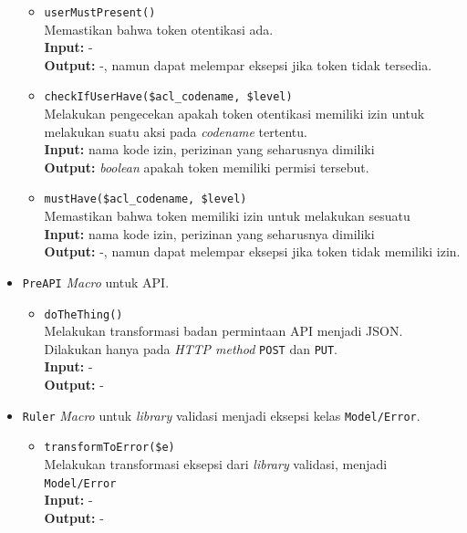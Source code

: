 \begin{itemize}
\begin{itemize}
                \item \texttt{userMustPresent()} \\
                    Memastikan bahwa token otentikasi ada. \\
                    \textbf{Input:} -\\
                    \textbf{Output:} -, namun dapat melempar eksepsi jika token tidak tersedia.
                    
                \item \texttt{checkIfUserHave(\$acl\_codename, \$level)} \\
                    Melakukan pengecekan apakah token otentikasi memiliki izin untuk melakukan suatu
                    aksi pada \textit{codename} tertentu.\\
                    \textbf{Input:} nama kode izin, perizinan yang seharusnya dimiliki\\
                    \textbf{Output:} \textit{boolean} apakah token memiliki permisi tersebut.
                    
                \item \texttt{mustHave(\$acl\_codename, \$level)} \\
                    Memastikan bahwa token memiliki izin untuk melakukan sesuatu \\
                    \textbf{Input:} nama kode izin, perizinan yang seharusnya dimiliki\\
                    \textbf{Output:} -, namun dapat melempar eksepsi jika token tidak memiliki izin.
            \end{itemize}
            
        \item \texttt{PreAPI}
            \textit{Macro} untuk API.
            \begin{itemize}
                \item \texttt{doTheThing()} \\
                    Melakukan transformasi badan permintaan API menjadi JSON. Dilakukan hanya
                    pada \textit{HTTP method} \texttt{POST} dan \texttt{PUT}.\\
                    \textbf{Input:} -\\
                    \textbf{Output:} -
            \end{itemize}
        
        \item \texttt{Ruler}
            \textit{Macro} untuk \textit{library} validasi menjadi eksepsi kelas \texttt{Model/Error}.
            \begin{itemize}
                \item \texttt{transformToError(\$e)} \\
                    Melakukan transformasi eksepsi dari \textit{library} validasi, menjadi 
                    \texttt{Model/Error} \\
                    \textbf{Input:} -\\
                    \textbf{Output:} -
            \end{itemize}
            

\end{itemize}
